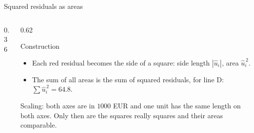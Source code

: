 \documentclass[aspectratio=169,11pt]{beamer}
\def\storelist{1/33,3/30,4/37,5/33,6/38,8/41,8/39,9/43,10/45,11/40,12/42,13/47}
\newcommand{\storepoints}{\addplot[only marks, mark=*, mark size=2.2pt, color=hsbiblau]
  coordinates {(1,33) (3,30) (4,37) (5,33) (6,38) (8,41) (8,39) (9,43) (10,45) (11,40) (12,42) (13,47)};}
\newcommand{\residualsof}[4]{%
  \foreach \px/\py in #1 {%
    \pgfmathsetmacro{\yh}{#2 + #3*\px}%
    \edef\tmpdraw{\noexpand\draw[#4] (axis cs:\px,\py) -- (axis cs:\px,\yh);}%
    \tmpdraw
  }}
\newcommand{\squaresof}[3]{%
  \foreach \px/\py in #1 {%
    \pgfmathsetmacro{\yh}{#2 + #3*\px}%
    \pgfmathsetmacro{\ur}{abs(\py - \yh)}%
    \pgfmathsetmacro{\pxr}{\px + \ur}%
    \edef\tmpdraw{\noexpand\fill[hsbirot!18] (axis cs:\px,\yh) rectangle (axis cs:\pxr,\py);}%
    \tmpdraw
  }%
  \foreach \px/\py in #1 {%
    \pgfmathsetmacro{\yh}{#2 + #3*\px}%
    \pgfmathsetmacro{\ur}{abs(\py - \yh)}%
    \pgfmathsetmacro{\pxr}{\px + \ur}%
    \edef\tmpdraw{\noexpand\draw[hsbirot, line width=0.8pt] (axis cs:\px,\yh) rectangle (axis cs:\pxr,\py);}%
    \tmpdraw
  }}
\begin{document}
\begin{frame}{Squared residuals as areas}
  \begin{columns}[T]
    \begin{column}{0.36\textwidth}
      \begin{center}
      \end{center}
    \end{column}
    \begin{column}{0.62\textwidth}
      \small
      \begin{block}{Construction}
        \begin{itemize}
          \item Each red residual becomes the side of a square:
                side length $|\hat{u}_i|$, area $\hat{u}_i^{\,2}$.
          \item The sum of all areas is the sum of squared residuals,
                for line D: $\sum \hat{u}_i^{\,2} = 64.8$.
        \end{itemize}
      \end{block}
      \footnotesize Scaling: both axes are in $1000$ EUR and one unit has the
      same length on both axes. Only then are the squares really squares and
      their areas comparable.
    \end{column}
  \end{columns}
\end{frame}
\end{document}
